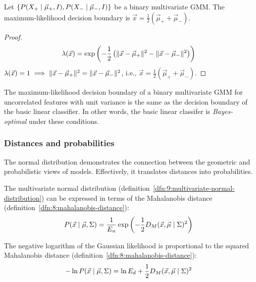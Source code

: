 \begin{proposition}
  Let $\{ P(X_+ \mid \vec{\mu}_+, I), P(X_- \mid \vec{\mu}_-, I)
    \}$ be a binary multivariate GMM.
  The maximum-likelihood decision boundary is $\vec{x} = \frac{1}{2}(\vec{\mu}_+
    + \vec{\mu}_-)$.
  \begin{proof}
    \begin{equation*}
      \lambda(\vec{x}) = \exp \left(-\frac{1}{2}\left(
        \lVert \vec{x} - \vec{\mu}_+ \rVert^2 - \lVert \vec{x} - \vec{\mu}_- \rVert^2
        \right)\right)
    \end{equation*}
    $\lambda(\vec{x}) = 1 \implies \lVert \vec{x} - \vec{\mu}_+ \rVert^2 = \lVert \vec{x} - \vec{\mu}_- \rVert^2$,
    i.e., $\vec{x} = \frac{1}{2}(\vec{\mu}_+ + \vec{\mu}_-)$.
  \end{proof}
\end{proposition}

The maximum-likelihood decision boundary of a binary multivariate GMM for
uncorrelated features with unit variance is the same as the decision boundary
of the basic linear classifier.
In other words, the basic linear classifer is \textit{Bayes-optimal} under
these conditions.

\subsubsection{Distances and probabilities}

The normal distribution demonstrates the connection between the geometric and
probabilistic views of models.
Effectively, it translates distances into probabilities.

\begin{dfn}
  \label{dfn:9:normal-mahalanobis}
  The multivariate normal distribution
  (definition~\ref{dfn:9:multivariate-normal-distribution})
  can be expressed in terms of the Mahalanobis distance
  (definition~\ref{dfn:8:mahalanobis-distance}):
  \begin{equation}
    P(\vec{x} \mid \vec{\mu}, \Sigma)
    = \frac{1}{E_n} \exp \left(
    -\frac{1}{2} D_M (\vec{x}, \vec{\mu} \mid \Sigma)^2
    \right)
  \end{equation}
\end{dfn}

\begin{dfn}
  \label{dfn:9:normal-log-likelihood}
  The negative logarithm of the Gaussian likelihood is proportional to the
  squared Mahalanobis distance (definition~\ref{dfn:8:mahalanobis-distance}):
  \begin{equation}
    - \ln P(\vec{x} \mid \vec{\mu}, \Sigma)
    = \ln E_d + \frac{1}{2} D_M (\vec{x}, \vec{\mu} \mid \Sigma)^2
  \end{equation}
\end{dfn}

